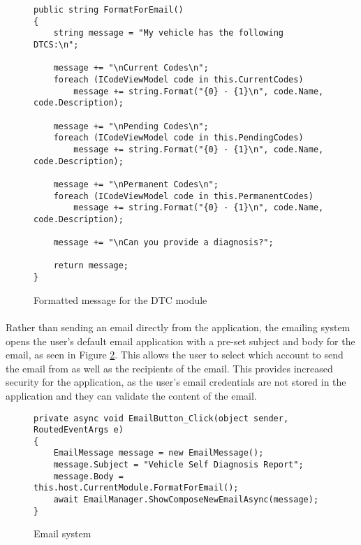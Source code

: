 {		\begin{figure}[h]
			\begin{lstlisting}
public string FormatForEmail()
{
	string message = "My vehicle has the following DTCS:\n";

	message += "\nCurrent Codes\n";
	foreach (ICodeViewModel code in this.CurrentCodes)
    	message += string.Format("{0} - {1}\n", code.Name, code.Description);

	message += "\nPending Codes\n";
	foreach (ICodeViewModel code in this.PendingCodes)
    	message += string.Format("{0} - {1}\n", code.Name, code.Description);

	message += "\nPermanent Codes\n";
	foreach (ICodeViewModel code in this.PermanentCodes)
    	message += string.Format("{0} - {1}\n", code.Name, code.Description);

	message += "\nCan you provide a diagnosis?";

	return message;
}
			\end{lstlisting}
			\caption{Formatted message for the DTC module}
			\label{code:EmailCodes}
		\end{figure}	
		
		\paragraph{}{
		Rather than sending an email directly from the application, the emailing system opens the user's default email application with a pre-set subject and body for the email, as seen in Figure \ref{code:Email}. This allows the user to select which account to send the email from as well as the recipients of the email. This provides increased security for the application, as the user's email credentials are not stored in the application and they can validate the content of the email.
		}		
		
		\begin{figure}[h]
			\begin{lstlisting}
private async void EmailButton_Click(object sender, RoutedEventArgs e)
{
	EmailMessage message = new EmailMessage();
	message.Subject = "Vehicle Self Diagnosis Report";            
    message.Body = this.host.CurrentModule.FormatForEmail();
	await EmailManager.ShowComposeNewEmailAsync(message);
}
			\end{lstlisting}
			\caption{Email system}
			\label{code:Email}
		\end{figure}	

}
